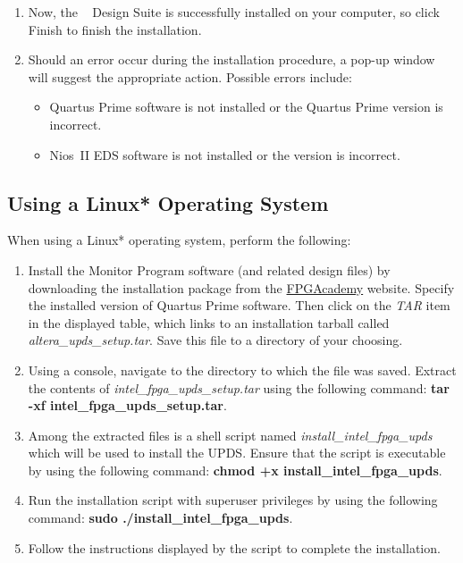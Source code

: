 \documentclass[11pt, twoside, pdftex]{article}
\begin{document}
\begin{enumerate}
\item Now, the \teamname~ Design Suite is successfully installed on your computer, so click {\sf Finish} to
finish the installation.

\item Should an error occur during the installation procedure, a pop-up window will suggest the appropriate action. 
Possible errors include:
\begin{itemize}
\item Quartus Prime software is not installed or the Quartus Prime version is incorrect.
\item Nios~II EDS software is not installed or the version is incorrect.
\end{itemize}
\end{enumerate}

\subsection{Using a Linux* Operating System}

When using a Linux* operating system, perform the following:

\begin{enumerate} 
\item Install the Monitor Program software (and related design files) by downloading the 
installation package from the 
\href{https://www.fpgacademy.org/tools.html}{FPGAcademy} website.
Specify the installed version of Quartus Prime software.
Then click on the {\it TAR} item in the displayed table, 
which links to an installation tarball called 
{\it altera\_upds\_setup.tar}. 
Save this file to a directory of your choosing.

\item Using a console, navigate to the directory to which the
file was saved. Extract the contents of 
{\it intel\_fpga\_upds\_setup.tar} using the following command: 
{\bf tar -xf intel\_fpga\_upds\_setup.tar}.

\item Among the extracted files is a shell script named
{\it install\_intel\_fpga\_upds} which will be used to install the
UPDS. Ensure that the script is executable by using the following
command: {\bf chmod +x install\_intel\_fpga\_upds}. 

\item Run the installation script with superuser privileges by
using the following command: 
{\bf sudo ./install\_intel\_fpga\_upds}.

\item Follow the instructions displayed by the script to complete
the installation.

\end{enumerate}
\end{document}
